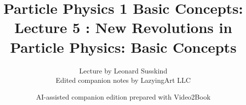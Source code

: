 \documentclass[11pt,oneside]{book}
\begin{document}
\frontmatter
\title{Particle Physics 1 Basic Concepts: Lecture 5 : New Revolutions in Particle Physics: Basic Concepts}
\author{Lecture by Leonard Susskind\\Edited companion notes by LazyingArt LLC}
\date{AI-assisted companion edition prepared with Video2Book}
\maketitle
\clearpage
\mainmatter

\end{document}
